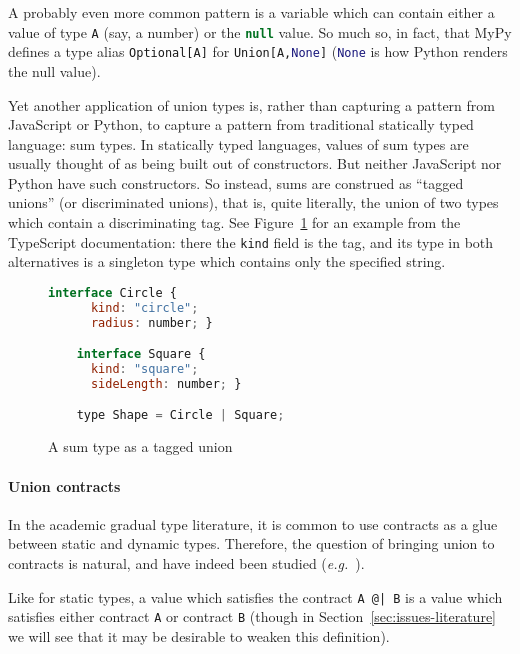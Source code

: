 \documentclass[sigplan,10pt,review,anonymous]{acmart}
\newcommand{\nickel}[1]{\lstinline[language=nickel]{#1}}
\newcommand{\typescript}[1]{\lstinline[language=JavaScript]{#1}}
\newcommand{\python}[1]{\lstinline[language=Python]{#1}}
\begin{document}
A probably even more common pattern is a variable which can contain
either a value of type \typescript{A} (say, a number) or the \typescript{null}
value. So much so, in fact, that MyPy defines a type alias
\python{Optional[A]} for \python{Union[A,None]} (\python{None} is how
Python renders the null value).

Yet another application of union types is, rather than capturing a
pattern from JavaScript or Python, to capture a pattern from
traditional statically typed language: sum types. In statically typed
languages, values of sum types are usually thought of as being built
out of constructors. But neither JavaScript nor Python have such
constructors. So instead, sums are construed as ``tagged unions'' (or
discriminated unions), that is, quite literally, the union of two
types which contain a discriminating tag. See
Figure~\ref{fig:tagged-union} for an example from the TypeScript
documentation: there the \typescript{kind} field is the tag, and its
type in both alternatives is a singleton type which contains only the
specified string.

\begin{figure}
  \centering
  \begin{lstlisting}[language=JavaScript]
    interface Circle {
      kind: "circle";
      radius: number; }

    interface Square {
      kind: "square";
      sideLength: number; }

    type Shape = Circle | Square;
\end{lstlisting}

  \caption{A sum type as a tagged union}
  \label{fig:tagged-union}
\end{figure}

\paragraph{Union contracts}

In the academic gradual type literature, it is common to use contracts
as a glue between static and dynamic types. Therefore, the question of
bringing union to contracts is natural, and have indeed been studied
(\emph{e.g.}~\cite{KeilThiemannUnionIntersection,RootCauseOfBlame}).

Like for static types, a value which satisfies the contract \nickel{A @| B}
is a value which satisfies either contract \nickel{A} or
contract \nickel{B} (though in Section~\ref{sec:issues-literature} we
will see that it may be desirable to weaken this definition).
\end{document}
